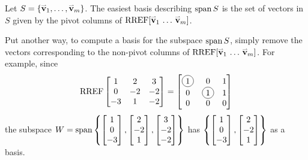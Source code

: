 \begin{fact}
  Let \(S=\{\mathbf{\accentset{\rightharpoonup}{v}}_1,\dots,\mathbf{\accentset{\rightharpoonup}{v}}_m\}\). The easiest basis describing
  \(\operatorname{span} S\) is the set of vectors in \(S\) given by the pivot columns
  of \(\operatorname{RREF}[\mathbf{\accentset{\rightharpoonup}{v}}_1\,\dots\,\mathbf{\accentset{\rightharpoonup}{v}}_m]\).

  \vspace{1em}

  Put another way, to compute a basis for the subspace \(\operatorname{span} S\),
  simply remove the vectors corresponding to the non-pivot columns of
  \(\operatorname{RREF}[\mathbf{\accentset{\rightharpoonup}{v}}_1\,\dots\,\mathbf{\accentset{\rightharpoonup}{v}}_m]\).
  For example, since
  \[
    \RREF
    \begin{bmatrix}
      1 & 2 & 3 \\
      0 & -2 & -2 \\
      -3 & 1 & -2
    \end{bmatrix}
      =
    \begin{bmatrix}
      \circledNumber{1} & 0 & 1 \\
      0 & \circledNumber{1} & 1 \\
      0 & 0 & 0
    \end{bmatrix}
  \]
  the subspace
  \(
    W=\operatorname{span}\left\{
      \begin{bmatrix}1\\0\\-3\end{bmatrix},
      \begin{bmatrix}2\\-2\\1\end{bmatrix},
      \begin{bmatrix}3\\-2\\-2\end{bmatrix}
    \right\}
  \)
  has
  \(
    \left\{
      \begin{bmatrix}1\\0\\-3\end{bmatrix},
      \begin{bmatrix}2\\-2\\1\end{bmatrix}
    \right\}
  \)
  as a basis.
\end{fact}

